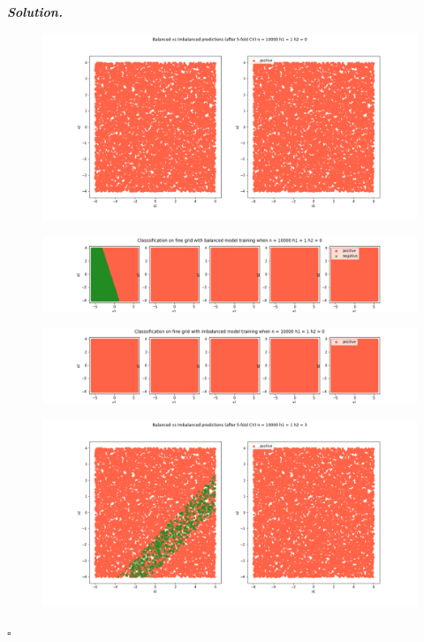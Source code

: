 \documentclass[10pt]{article}
\newenvironment{solution}[1][\it{Solution}]{\textbf{#1. } }{$\square$}
\begin{document}
\begin{solution}
\begin{figure}[H]
\end{figure}
\begin{figure}[H]
\includegraphics[width=16cm, keepaspectratio]{./3/37}
\end{figure}
\begin{figure}[H]
\includegraphics[width=16cm, keepaspectratio]{./3/38}
\end{figure}
\begin{figure}[H]
\includegraphics[width=16cm, keepaspectratio]{./3/39}
\end{figure}
\begin{figure}[H]
\includegraphics[width=16cm, keepaspectratio]{./3/40}
\end{figure}

\end{solution}
\end{document}
